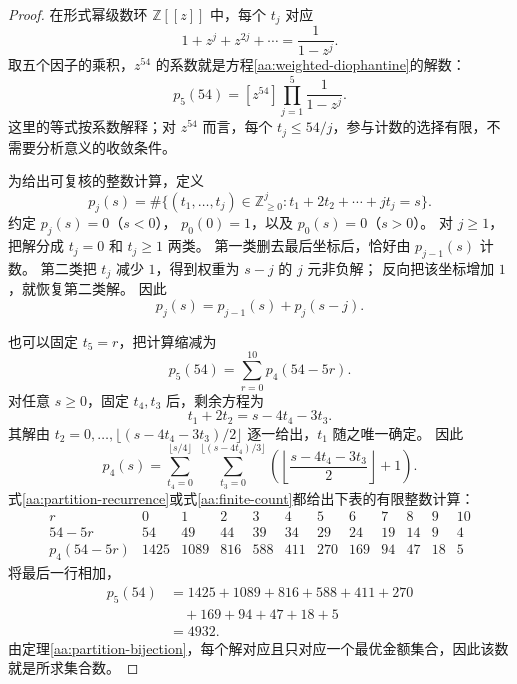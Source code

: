 \documentclass[UTF8,a4paper]{ctexbook}
\theoremstyle{definition}
\numberwithin{equation}{chapter}
\newcommand{\1}{\mathbf{1}}
\begin{document}
\begin{proof}
在形式幂级数环 \(\mathbb Z[[z]]\) 中，每个 \(t_j\) 对应
\[
1+z^j+z^{2j}+\cdots=\frac{1}{1-z^j}.
\]
取五个因子的乘积，\(z^{54}\) 的系数就是方程\eqref{aa:weighted-diophantine}的解数：
\begin{equation}\label{aa:partition-generator}
p_5(54)=[z^{54}]\prod_{j=1}^{5}\frac{1}{1-z^j}.
\end{equation}
这里的等式按系数解释；对 \(z^{54}\) 而言，每个 \(t_j\le54/j\)，参与计数的选择有限，不需要分析意义的收敛条件。

为给出可复核的整数计算，定义
\[
p_j(s)=
\#\{(t_1,\ldots,t_j)\in\mathbb Z_{\ge0}^{j}:
t_1+2t_2+\cdots+jt_j=s\}.
\]
约定 \(p_j(s)=0\)（\(s<0\)），
\(p_0(0)=1\)，以及 \(p_0(s)=0\)（\(s>0\)）。
对 \(j\ge1\)，把解分成 \(t_j=0\) 和 \(t_j\ge1\) 两类。
第一类删去最后坐标后，恰好由 \(p_{j-1}(s)\) 计数。
第二类把 \(t_j\) 减少 \(1\)，得到权重为 \(s-j\) 的 \(j\) 元非负解；
反向把该坐标增加 \(1\)，就恢复第二类解。
因此
\begin{equation}\label{aa:partition-recurrence}
p_j(s)=p_{j-1}(s)+p_j(s-j).
\end{equation}

也可以固定 \(t_5=r\)，把计算缩减为
\[
p_5(54)=\sum_{r=0}^{10}p_4(54-5r).
\]
对任意 \(s\ge0\)，固定 \(t_4,t_3\) 后，剩余方程为
\[
t_1+2t_2=s-4t_4-3t_3.
\]
其解由
\(t_2=0,\ldots,\lfloor(s-4t_4-3t_3)/2\rfloor\)
逐一给出，\(t_1\) 随之唯一确定。
因此
\begin{equation}\label{aa:finite-count}
p_4(s)=
\sum_{t_4=0}^{\lfloor s/4\rfloor}
\ \sum_{t_3=0}^{\lfloor(s-4t_4)/3\rfloor}
\left(
\left\lfloor\frac{s-4t_4-3t_3}{2}\right\rfloor+1
\right).
\end{equation}
式\eqref{aa:partition-recurrence}或式\eqref{aa:finite-count}都给出下表的有限整数计算：
\[
\begin{array}{c|rrrrrrrrrrr}
r&0&1&2&3&4&5&6&7&8&9&10\\ \hline
54-5r&54&49&44&39&34&29&24&19&14&9&4\\
p_4(54-5r)&1425&1089&816&588&411&270&169&94&47&18&5
\end{array}
\]
将最后一行相加，
\[
\begin{aligned}
p_5(54)
&=1425+1089+816+588+411+270\\
&\quad+169+94+47+18+5\\
&=4932.
\end{aligned}
\]
由定理\ref{aa:partition-bijection}，每个解对应且只对应一个最优金额集合，因此该数就是所求集合数。
\end{proof}
\end{document}
